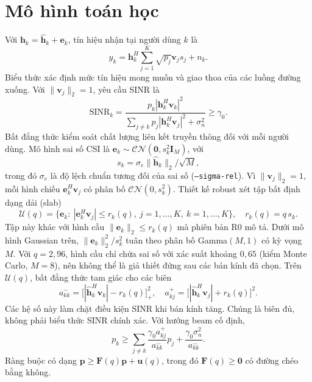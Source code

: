 \documentclass[11pt,onecolumn]{IEEEtran}
\begin{document}
\section{Mô hình toán học}
Với $\mathbf h_k=\widehat{\mathbf h}_k+\mathbf e_k$, tín hiệu nhận tại người dùng $k$ là
\begin{equation}
y_k=\mathbf h_k^H\sum_{j=1}^K\sqrt{p_j}\mathbf v_j s_j+n_k.
\end{equation}
Biểu thức xác định mức tín hiệu mong muốn và giao thoa của các luồng đường xuống. Với $\|\mathbf v_j\|_2=1$, yêu cầu SINR là
\begin{equation}
\mathrm{SINR}_k=\frac{p_k|\mathbf h_k^H\mathbf v_k|^2}{\sum_{j\neq k}p_j|\mathbf h_k^H\mathbf v_j|^2+\sigma_n^2}\geq\gamma_0.
\end{equation}
Bất đẳng thức kiểm soát chất lượng liên kết truyền thông đối với mỗi người dùng. Mô hình sai số CSI là $\mathbf e_k\sim\mathcal{CN}(\mathbf 0,s_k^2\mathbf I_M)$, với
\begin{equation}
s_k=\sigma_e\|\widehat{\mathbf h}_k\|_2/\sqrt M,
\end{equation}
trong đó $\sigma_e$ là độ lệch chuẩn tương đối của sai số (\texttt{--sigma-rel}). Vì $\|\mathbf v_j\|_2=1$, mỗi hình chiếu $\mathbf e_k^H\mathbf v_j$ có phân bố $\mathcal{CN}(0,s_k^2)$. Thiết kế robust xét tập bất định dạng dải (slab)
\begin{equation}
\mathcal U(q)=\big\{\mathbf e_k:\ |\mathbf e_k^H\mathbf v_j|\leq r_k(q),\ j=1,\dots,K,\ k=1,\dots,K\big\},\quad r_k(q)=q\,s_k .
\end{equation}
Tập này khác với hình cầu $\|\mathbf e_k\|_2\leq r_k(q)$ mà phiên bản R0 mô tả. Dưới mô hình Gaussian trên, $\|\mathbf e_k\|_2^2/s_k^2$ tuân theo phân bố Gamma$(M,1)$ có kỳ vọng $M$. Với $q=2{,}96$, hình cầu chỉ chứa sai số với xác suất khoảng $0{,}65$ (kiểm Monte Carlo, $M=8$), nên không thể là giả thiết đứng sau các bán kính đã chọn. Trên $\mathcal U(q)$, bất đẳng thức tam giác cho các biên
\begin{equation}
a_{kk}^{-}=\big[|\widehat{\mathbf h}_k^H\mathbf v_k|-r_k(q)\big]_{+}^{2},\quad a_{kj}^{+}=\big[|\widehat{\mathbf h}_k^H\mathbf v_j|+r_k(q)\big]^2 .
\end{equation}
Các hệ số này làm chặt điều kiện SINR khi bán kính tăng. Chúng là biên đủ, không phải biểu thức SINR chính xác. Với hướng beam cố định,
\begin{equation}
p_k\geq\sum_{j\neq k}\frac{\gamma_0 a_{kj}^{+}}{a_{kk}^{-}}p_j+\frac{\gamma_0\sigma_n^2}{a_{kk}^{-}}.
\end{equation}
Ràng buộc có dạng $\mathbf p\geq\mathbf F(q)\mathbf p+\mathbf u(q)$, trong đó $\mathbf F(q)\geq\mathbf 0$ có đường chéo bằng không.
\end{document}
